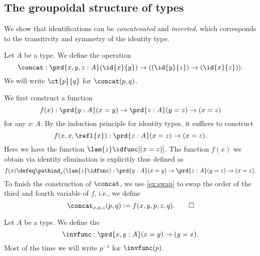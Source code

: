 \subsection{The groupoidal structure of types}\label{sec:groupoid}
We show that identifications can be \emph{concatenated} and \emph{inverted}, which corresponds to the transitivity and symmetry of the identity type.

\begin{defn}\label{defn:id_concat}
Let $A$ be a type. We define the  operation
\begin{equation*}
\concat : \prd{x,y,z:A} (\id{x}{y})\to ((\id{y}{z})\to (\id{x}{z})).
\end{equation*}
We will write $\ct{p}{q}$ for $\concat(p,q)$.
\end{defn}

\begin{constr}
  We first construct a function
  \begin{equation*}
    f(x):\prd{y:A}(x=y)\to\prd{z:A}(y=z)\to(x=z)
  \end{equation*}
  for any $x:A$. By the induction principle for identity types, it suffices to construct
  \begin{equation*}
    f(x,x,\refl{x}):\prd{z:A} (x=z)\to(x=z).
  \end{equation*}
  Here we have the function $\lam{z}\idfunc[(x=z)]$. The function $f(x)$ we obtain via identity elimination is explicitly thus defined as
  \begin{equation*}
    f(x)\defeq\pathind_x(\lam{z}\idfunc):\prd{y:A} (x=y)\to \prd{z:A} (y=z)\to (x=z).
  \end{equation*}
  To finish the construction of $\concat$, we use \cref{ex:swap} to swap the order of the third and fourth variable of $f$, i.e., we define
  \begin{equation*}
    \concat_{x,y,z}(p,q):=f(x,y,p,z,q).\qedhere
  \end{equation*}
\end{constr}

\begin{defn}\label{defn:id_inv}
Let $A$ be a type. We define the 
\begin{equation*}
\invfunc:\prd{x,y:A} (x=y)\to (y=x).
\end{equation*}
Most of the time we will write $p^{-1}$ for $\invfunc(p)$.
\end{defn}

